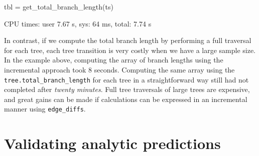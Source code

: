 \documentclass[graybox]{svmult}
\newcommand{\msprime}[0]{\texttt{msprime}}
\newcommand{\tskit}[0]{\texttt{tskit}}
\begin{document}
\begin{pythoncode}
tbl = get_total_branch_length(ts)

CPU times: user 7.67 s, sys: 64 ms, total: 7.74 s
\end{pythoncode}

In contrast, if we compute the total branch length by performing a
full traversal for each tree, each tree transition is very costly
when we have a large sample size. In the example above, computing the array of branch lengths
using the incremental approach took 8 seconds. Computing the
same array using the \texttt{tree.total\_branch\_length} for each tree
in a straightforward way still had not completed after \emph{twenty
minutes}. Full tree traversals of large trees are
expensive, and great gains can be made if calculations can be expressed
in an incremental manner using \texttt{edge\_diffs}.





\section{Validating analytic predictions}\label{validating-analytical-predictions}
\end{document}
